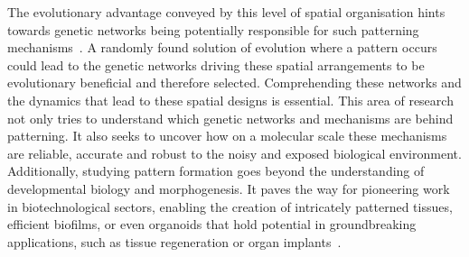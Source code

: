The evolutionary advantage conveyed by this level of spatial organisation hints towards genetic networks being potentially responsible for such patterning mechanisms~\parencite{caro2005adaptive}.
A randomly found solution of evolution where a pattern occurs could lead to the genetic networks driving these spatial arrangements to be evolutionary beneficial and therefore selected. %
Comprehending these networks and the dynamics that lead to these spatial designs is essential.
This area of research not only tries to understand which genetic networks and mechanisms are behind patterning.
It also seeks to uncover how on a molecular scale these mechanisms are reliable, accurate and robust to the noisy and exposed biological environment.
Additionally, studying pattern formation goes beyond the understanding of developmental biology and morphogenesis.
It paves the way for pioneering work in biotechnological sectors, enabling the creation of intricately patterned tissues, efficient biofilms, or even organoids that hold potential in groundbreaking applications, such as tissue regeneration or organ implants~\parencite{Scholes2017,Tan2018}. %






%



